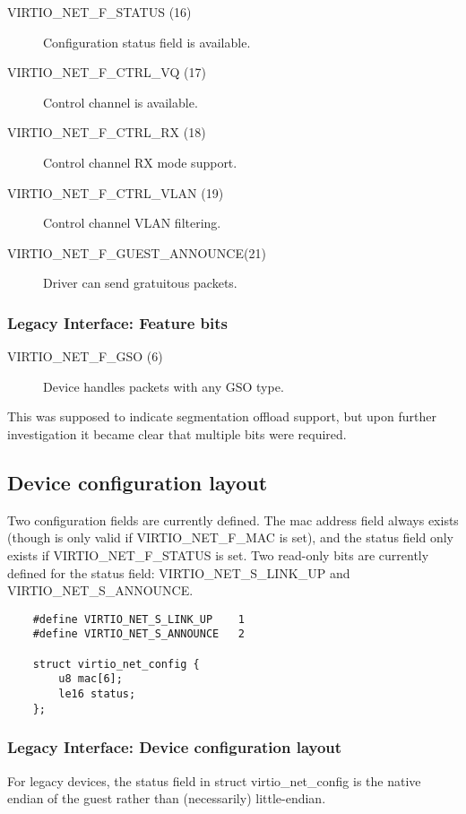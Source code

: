 \begin{description}
\item[VIRTIO_NET_F_STATUS (16)] Configuration status field is
    available.

\item[VIRTIO_NET_F_CTRL_VQ (17)] Control channel is available.

\item[VIRTIO_NET_F_CTRL_RX (18)] Control channel RX mode support.

\item[VIRTIO_NET_F_CTRL_VLAN (19)] Control channel VLAN filtering.

\item[VIRTIO_NET_F_GUEST_ANNOUNCE(21)] Driver can send gratuitous
    packets.
\end{description}

\subsubsection{Legacy Interface: Feature bits}\label{sec:Device Types / Network Device / Feature bits / Legacy Interface: Feature bits}
\begin{description}
\item[VIRTIO_NET_F_GSO (6)] Device handles packets with any GSO type.
\end{description}

This was supposed to indicate segmentation offload support, but
upon further investigation it became clear that multiple bits
were required.

\subsection{Device configuration layout}\label{sec:Device Types / Network Device / Device configuration layout}

Two configuration fields are currently defined. The mac address field
always exists (though is only valid if VIRTIO_NET_F_MAC is set), and
the status field only exists if VIRTIO_NET_F_STATUS is set. Two
read-only bits are currently defined for the status field:
VIRTIO_NET_S_LINK_UP and VIRTIO_NET_S_ANNOUNCE.

\begin{lstlisting}
	#define VIRTIO_NET_S_LINK_UP	1
	#define VIRTIO_NET_S_ANNOUNCE	2

	struct virtio_net_config {
		u8 mac[6];
		le16 status;
	};
\end{lstlisting}

\subsubsection{Legacy Interface: Device configuration layout}\label{sec:Device Types / Network Device / Device configuration layout / Legacy Interface: Device configuration layout}
For legacy devices, the status field in struct virtio_net_config is the
native endian of the guest rather than (necessarily) little-endian.


